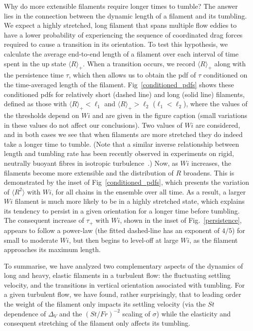 \documentclass[aps,prl,twocolumn,superscriptaddress,floatfix,tightenlines,showpacs,notitlepage]{revtex4-1}
\begin{document}
Why do more extensible filaments require longer times to tumble? The answer lies in the connection between the dynamic length of a filament and its tumbling. We expect a highly stretched, long filament
that spans multiple flow eddies to have a lower probability of experiencing the sequence of coordinated
drag forces required to cause a transition in its orientation. To test this hypothesis, we calculate the average end-to-end length of a filament over each interval of time spent in the up state $\langle R \rangle_+$. When a transition occurs, we record $\langle R \rangle_+$ along with the persistence time $\tau$, which then allows us to obtain the pdf of $\tau$ conditioned on the time-averaged length of the filament.  Fig~\ref{conditioned_pdfs} shows these conditioned pdfs for relatively short (dashed line) and long (solid line) filaments, defined as those with $\langle R \rangle_+ < \ell_1$ and $\langle R \rangle_+ > \ell_2$ ($\ell_1 <\ell_2$), where the values of the thresholds depend on $Wi$ and are given in the figure caption (small variations in these values do not affect our conclusions). Two values of $Wi$ are considered, and in both cases we see that when filaments are more stretched they do indeed take a longer time to tumble. (Note that a similar inverse relationship between length and tumbling rate has been recently observed in experiments on rigid, neutrally buoyant fibres in isotropic turbulence~\citep{Oehmke2020}.) Now, as $Wi$ increases, the filaments become more extensible and the distribution of $R$ broadens. This is demonstrated by the inset of Fig~\ref{conditioned_pdfs}, which presents the variation of $\langle R^2 \rangle$ with $Wi$, for all chains in the ensemble over all time. As a result, a larger $Wi$ filament is much more likely to be in a highly stretched state, which explains its tendency to persist in a given orientation for a longer time before tumbling. The consequent increase of $\tau_+$ with $Wi$, shown in the inset of Fig.~\ref{persistence}, appears to follow a power-law (the fitted dashed-line has an exponent of $4/5$) for small to moderate $Wi$, but then begins to level-off at large $Wi$, as the filament approaches its maximum length.

To summarise, we have analyzed two complementary aspects of the dynamics of 
long and heavy, elastic filaments in a turbulent flow: the fluctuating settling velocity, and the transitions in vertical orientation associated with tumbling.
For a given turbulent flow, we have found, rather surprisingly, that to leading order the 
weight of the filament only impacts its settling velocity (via the $St$ dependence of $\Delta_V$ and the $(St/Fr)^{-2}$ scaling of $\sigma$)
while the elasticity and consequent stretching of the filament only affects 
its tumbling. 
\end{document}
